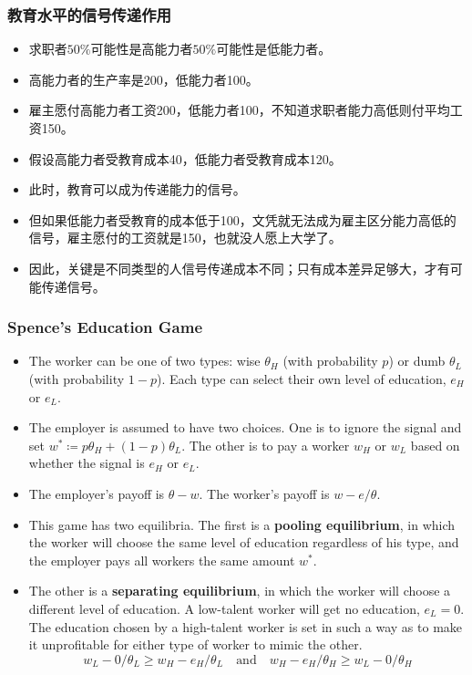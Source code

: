 \documentclass[UTF8,11pt,colorlinks,compress,openany]{beamer}%
\begin{document}
\begin{frame}\frametitle{教育水平的信号传递作用}
\begin{itemize}
	\item 求职者$50\%$可能性是高能力者$50\%$可能性是低能力者。
	\item 高能力者的生产率是200，低能力者100。
	\item 雇主愿付高能力者工资200，低能力者100，不知道求职者能力高低则付平均工资150。
	\item 假设高能力者受教育成本40，低能力者受教育成本120。
	\item 此时，教育可以成为传递能力的信号。
	\item 但如果低能力者受教育的成本低于100，文凭就无法成为雇主区分能力高低的信号，雇主愿付的工资就是150，也就没人愿上大学了。
	\item 因此，关键是不同类型的人信号传递成本不同；只有成本差异足够大，才有可能传递信号。
\end{itemize}
\end{frame}

\begin{frame}\frametitle{Spence's Education Game}
\begin{itemize}
	\item The worker can be one of two types: wise $\theta_H$ (with probability $p$) or dumb $\theta_L$ (with probability $1-p$). Each type can select their own level of education, $e_H$ or $e_L$.
	\item The employer is assumed to have two choices. One is to ignore the signal and set $w^*\coloneqq p\theta_H+(1-p)\theta_L$. The other is to pay a worker $w_H$ or $w_L$ based on whether the signal is $e_H$ or $e_L$.
	\item The employer's payoff is $\theta-w$. The worker's payoff is $w-e/\theta$.
	\item This game has two equilibria. The first is a \textbf{pooling equilibrium}, in which the worker will choose the same level of education regardless of his type, and the employer pays all workers the same amount $w^*$.
	\item The other is a \textbf{separating equilibrium}, in which the worker will choose a different level of education. A low-talent worker will get no education, $e_L=0$. The education chosen by a high-talent worker is set in such a way as to make it unprofitable for either type of worker to mimic the other.
	\[w_L-0/\theta_L\geq w_H-e_H/\theta_L\quad\mbox{and}\quad w_H-e_H/\theta_H\geq w_L-0/\theta_H\]
\end{itemize}
\end{frame}
\end{document}
